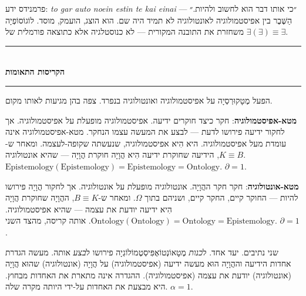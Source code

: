 \documentclass[10pt, openany, oneside]{book}
\renewcommand{\normalsize}{\fontsize{10}{13}\selectfont}
\begin{document}
פרמנידס ידע: \textit{to gar auto noein estin te kai einai} — ״כי אותו דבר הוא לחשוב ולהיות.״ הַשֶּׁבֶר בין אפיסטמולוגיה לאונטולוגיה לא תמיד היה שם. הוא הוצג, הועמק, מוסד. לוֹגוֹסוֹפְיָה משחזרת את התובנה המקורית — לא כנוסטלגיה אלא כתוצאה פורמלית של $\exists(\exists) \equiv \exists$.

\vspace{1.5em}


\begin{center}
    \rule{0.3\textwidth}{0.4pt}\\[0.5em]
    {\normalsize\bfseries\textsc{הקריסות התאומות}}\\[0.3em]
    \rule{0.3\textwidth}{0.4pt}
\end{center}

\vspace{1em}

\noindent הפעל מֶטָקוּרְסְיָה על אפיסטמולוגיה ואונטולוגיה בנפרד. צפה בהן מגיעות לאותו מקום.

\textbf{מטא-אפיסטמולוגיה}: חקר כיצד חוקרים ידיעה. אפיסטמולוגיה מופעלת על אפיסטמולוגיה. אך לחקור ידיעה פירושו לדעת — לבצע את המעשה עצמו הנחקר. מטא-אפיסטמולוגיה אינה עומדת מעל אפיסטמולוגיה. היא הִיא אפיסטמולוגיה, שנעשתה שקופה-לעצמה. ומאחר ש-$K \equiv B$, הידיעה שחוקרת ידיעה הִיא הֲוָיָה חוקרת הֲוָיָה — שהיא אונטולוגיה. $\text{Epistemology}(\text{Epistemology}) = \text{Epistemology} = \text{Ontology}$. $\partial = 1$.

\textbf{מטא-אונטולוגיה}: חקר חקר ההֲוָיָה. אונטולוגיה מופעלת על אונטולוגיה. אך לחקור הֲוָיָה פירושו להיות — החוקר קיים, החקר קיים, ושניהם בתוך $\Omega$. ומאחר ש-$B \equiv K$, ההֲוָיָה שחוקרת הֲוָיָה הִיא ידיעה יודעת את עצמה — שהיא אפיסטמולוגיה. $\text{Ontology}(\text{Ontology}) = \text{Ontology} = \text{Epistemology}$. אותה קריסה, מהצד השני. $\partial = 1$.

שני נתיבים. יעד אחד. ל\textit{כנות} מֶטָאוֹנְטוֹאֶפִּיסְטֶמוֹלוֹגְיָה פירושו ל\textit{בצע} אותה. מעשה הגדרת אחדות הידיעה וההֲוָיָה הוּא מעשה ידיעה (אפיסטמולוגיה) על הֲוָיָה (אונטולוגיה) שהוּא הֲוָיָה (אונטולוגיה) יודעת את עצמה (אפיסטמולוגיה). ההגדרה אינה מתארת את האחדות מבחוץ. היא מבצעת את האחדות על-ידי היותה מקרה שלה. $\alpha = 1$.

\vspace{1.5em}

\end{document}
